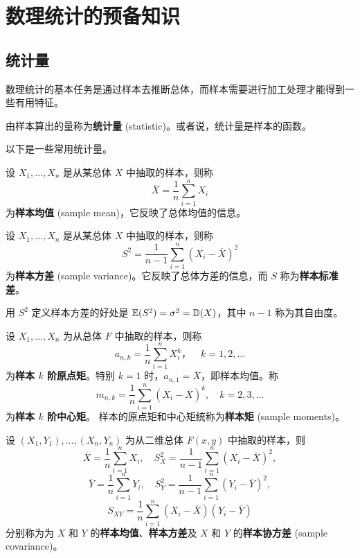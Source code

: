 \chapter{数理统计的预备知识}\label{chap:数理统计的预备知识}

\section{统计量}\label{sec:统计量}
数理统计的基本任务是通过样本去推断总体，而样本需要进行加工处理才能得到一些有用特征。
\begin{definition}[统计量] \label{def:statistic}
由样本算出的量称为\textbf{统计量} (statistic)。或者说，统计量是样本的函数。
\end{definition}
以下是一些常用统计量。
\begin{definition} \label{def:sample_mean}
设 $X_1,\ldots,X_n$ 是从某总体 $X$ 中抽取的样本，则称
\[
\overline{X} = \frac{1}{n}\sum_{i=1}^n X_i
\]
为\textbf{样本均值} (sample mean)，它反映了总体均值的信息。
\end{definition}
\begin{definition} \label{def:sample_variance}
设 $X_1,\ldots,X_n$ 是从某总体 $X$ 中抽取的样本，则称
\[
S^2 = \frac{1}{n-1}\sum_{i=1}^n (X_i - \overline{X})^2
\]
为\textbf{样本方差} (sample variance)。它反映了总体方差的信息，而 $S$ 称为\textbf{样本标准差}。
\end{definition}
\begin{remark}
    用 $S^2$ 定义样本方差的好处是 $\mathbb{E}(S^2) = \sigma^2 = \mathbb{D}(X)$，其中 $n-1$ 称为其自由度。
\end{remark}

\begin{definition} \label{def:sample_moments}
设 $X_1,\ldots,X_n$ 为从总体 $F$ 中抽取的样本，则称
\[
a_{n,k} = \frac{1}{n}\sum_{i=1}^n X_i^k，\quad k=1,2,\ldots
\]
为\textbf{样本 $k$ 阶原点矩}。特别 $k=1$ 时，$a_{n,1} = \overline{X}$，即样本均值。称
\[
m_{n,k} = \frac{1}{n}\sum_{i=1}^n (X_i - \overline{X})^k, \quad k=2,3,\ldots
\]
为\textbf{样本 $k$ 阶中心矩}。
样本的原点矩和中心矩统称为\textbf{样本矩} (sample moments)。
\end{definition}

\begin{definition} \label{def:sample_moments_bivariate}
设 $(X_1,Y_1),\ldots,(X_n,Y_n)$ 为从二维总体 $F(x,y)$ 中抽取的样本，则
\[
\overline{X} = \frac{1}{n}\sum_{i=1}^n X_i, \quad S_X^2 = \frac{1}{n-1}\sum_{i=1}^n (X_i - \overline{X})^2,
\]
\[
\overline{Y} = \frac{1}{n}\sum_{i=1}^n Y_i, \quad S_Y^2 = \frac{1}{n-1}\sum_{i=1}^n (Y_i - \overline{Y})^2,
\]
\[
S_{XY} = \frac{1}{n}\sum_{i=1}^n (X_i - \overline{X})(Y_i - \overline{Y})
\]
分别称为为 $X$ 和 $Y$ 的\textbf{样本均值}、\textbf{样本方差}及 $X$ 和 $Y$ 的\textbf{样本协方差} (sample covariance)。
\end{definition}

